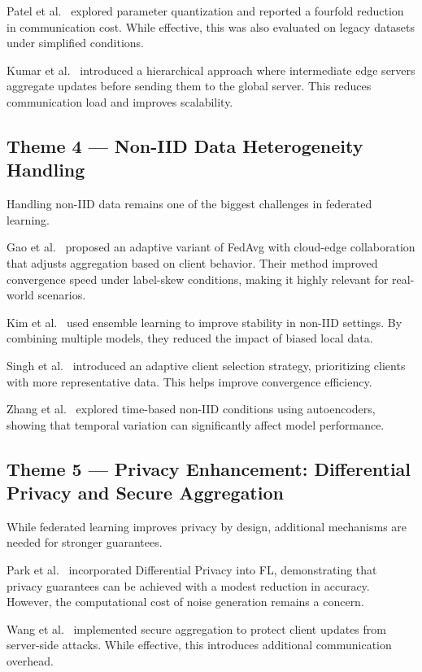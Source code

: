 \documentclass[conference]{IEEEtran}
\begin{document}
Patel et al.~\cite{patel2021} explored parameter quantization and reported a fourfold reduction in communication cost. While effective, this was also evaluated on legacy datasets under simplified conditions.

Kumar et al.~\cite{kumar2023} introduced a hierarchical approach where intermediate edge servers aggregate updates before sending them to the global server. This reduces communication load and improves scalability.

\subsection{Theme 4 --- Non-IID Data Heterogeneity Handling}

Handling non-IID data remains one of the biggest challenges in federated learning.

Gao et al.~\cite{gao2023} proposed an adaptive variant of FedAvg with cloud-edge collaboration that adjusts aggregation based on client behavior. Their method improved convergence speed under label-skew conditions, making it highly relevant for real-world scenarios.

Kim et al.~\cite{kim2022} used ensemble learning to improve stability in non-IID settings. By combining multiple models, they reduced the impact of biased local data.

Singh et al.~\cite{singh2022} introduced an adaptive client selection strategy, prioritizing clients with more representative data. This helps improve convergence efficiency.

Zhang et al.~\cite{zhang2022} explored time-based non-IID conditions using autoencoders, showing that temporal variation can significantly affect model performance.

\subsection{Theme 5 --- Privacy Enhancement: Differential Privacy and Secure Aggregation}

While federated learning improves privacy by design, additional mechanisms are needed for stronger guarantees.

Park et al.~\cite{park2023} incorporated Differential Privacy into FL, demonstrating that privacy guarantees can be achieved with a modest reduction in accuracy. However, the computational cost of noise generation remains a concern.

Wang et al.~\cite{wang2022} implemented secure aggregation to protect client updates from server-side attacks. While effective, this introduces additional communication overhead.
\end{document}
